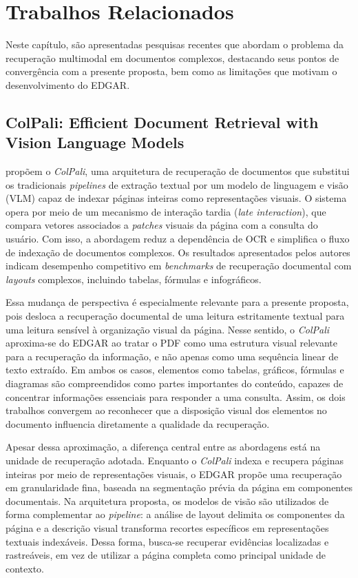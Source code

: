 \chapter{Trabalhos Relacionados}
\label{sec:trabalhos-relacionados}

Neste capítulo, são apresentadas pesquisas recentes que abordam o problema da recuperação multimodal em documentos complexos, destacando seus pontos de convergência com a presente proposta, bem como as limitações que motivam o desenvolvimento do EDGAR.

\section{ColPali: Efficient Document Retrieval with Vision Language Models}
\label{sec:colpali}

 propõem o \textit{ColPali}, uma arquitetura de recuperação de documentos que substitui os tradicionais \textit{pipelines} de extração textual por um modelo de linguagem e visão (VLM) capaz de indexar páginas inteiras como representações visuais. O sistema opera por meio de um mecanismo de interação tardia (\textit{late interaction}), que compara vetores associados a \textit{patches} visuais da página com a consulta do usuário. Com isso, a abordagem reduz a dependência de OCR e simplifica o fluxo de indexação de documentos complexos. Os resultados apresentados pelos autores indicam desempenho competitivo em \textit{benchmarks} de recuperação documental com \textit{layouts} complexos, incluindo tabelas, fórmulas e infográficos.

Essa mudança de perspectiva é especialmente relevante para a presente proposta, pois desloca a recuperação documental de uma leitura estritamente textual para uma leitura sensível à organização visual da página. Nesse sentido, o \textit{ColPali} aproxima-se do EDGAR ao tratar o PDF como uma estrutura visual relevante para a recuperação da informação, e não apenas como uma sequência linear de texto extraído. Em ambos os casos, elementos como tabelas, gráficos, fórmulas e diagramas são compreendidos como partes importantes do conteúdo, capazes de concentrar informações essenciais para responder a uma consulta. Assim, os dois trabalhos convergem ao reconhecer que a disposição visual dos elementos no documento influencia diretamente a qualidade da recuperação.

Apesar dessa aproximação, a diferença central entre as abordagens está na unidade de recuperação adotada. Enquanto o \textit{ColPali} indexa e recupera páginas inteiras por meio de representações visuais, o EDGAR propõe uma recuperação em granularidade fina, baseada na segmentação prévia da página em componentes documentais. Na arquitetura proposta, os modelos de visão são utilizados de forma complementar ao \textit{pipeline}: a análise de layout delimita os componentes da página e a descrição visual transforma recortes específicos em representações textuais indexáveis. Dessa forma, busca-se recuperar evidências localizadas e rastreáveis, em vez de utilizar a página completa como principal unidade de contexto.

